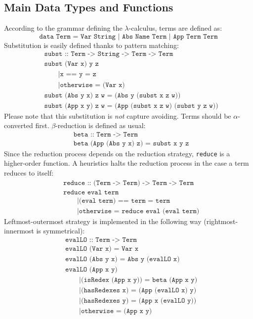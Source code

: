 \subsection{Main Data Types and Functions}
According to the grammar defining the $\lambda$-calculus, terms are defined as:
$$
\texttt{data Term = Var String | Abs Name Term | App Term Term}
$$
Substitution is easily defined thanks to pattern matching:
\begin{align*}
&\texttt{subst :: Term -> String -> Term -> Term}\\
&\texttt{subst (Var x) y z}\\
&\qquad\texttt{|x == y = z}\\
&\qquad\texttt{|otherwise = (Var x)}\\
&\texttt{subst (Abs y x) z w = (Abs y (subst x z w))}\\
&\texttt{subst (App x y) z w = (App (subst x z w) (subst y z w))}
\end{align*}
Please note that this substitution is \emph{not} capture avoiding. Terms should be $\alpha$-converted first. $\beta$-reduction is defined as usual:
\begin{align*}
&\texttt{beta :: Term -> Term}\\
&\texttt{beta (App (Abs y x) z) = subst x y z}
\end{align*}
Since the reduction process depends on the reduction strategy, \texttt{reduce} is a higher-order function. A heuristics halts the reduction process in the case a term reduces to itself:
\begin{align*}
&\texttt{reduce :: (Term -> Term) -> Term -> Term}\\
&\texttt{reduce eval term}\\
&\qquad\texttt{|(eval term) == term = term}\\
&\qquad\texttt{|otherwise = reduce eval (eval term)}
\end{align*}
Leftmost-outermost strategy is implemented in the following way (rightmost-innermost is symmetrical):
\begin{align*}
&\texttt{evalLO :: Term -> Term}\\
&\texttt{evalLO (Var x) = Var x}\\
&\texttt{evalLO (Abs y x) = Abs y (evalLO x)}\\
&\texttt{evalLO (App x y)}\\
&\qquad\texttt{|(isRedex (App x y)) = beta (App x y)}\\
&\qquad\texttt{|(hasRedexes x) = (App (evalLO x) y)}\\
&\qquad\texttt{|(hasRedexes y) = (App x (evalLO y))}\\
&\qquad\texttt{|otherwise = (App x y)}
\end{align*}